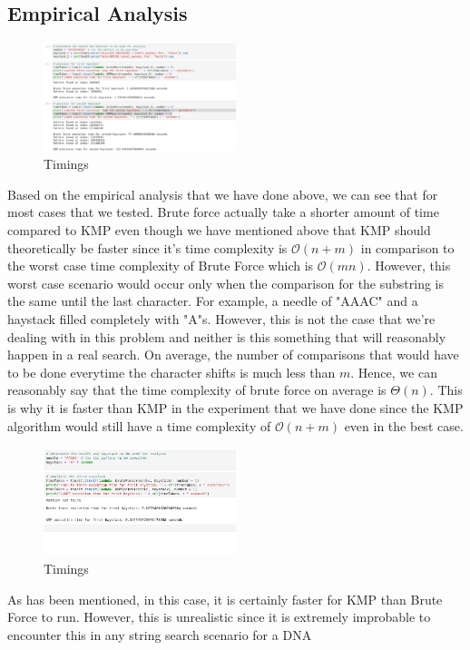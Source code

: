 \subsection*{Empirical Analysis}

\begin{figure}[h!]
    \centering
    \includegraphics[width=0.50\textwidth]{images/jupyter.png}
    \caption{Timings}
\end{figure}

Based on the empirical analysis that we have done above, we can see that for most cases that we tested. Brute force actually take a shorter amount of time compared to KMP even though we have mentioned above that KMP should theoretically be faster since it's time complexity is $\mathcal{O}(n+m)$ in comparison to the worst case time complexity of Brute Force which is $\mathcal{O}(mn)$. However, this worst case scenario would occur only when the comparison for the substring is the same until the last character. For example, a needle of "AAAC" and a haystack filled completely with "A"s. However, this is not the case that we're dealing with in this problem and neither is this something that will reasonably happen in a real search. On average, the number of comparisons that would have to be done everytime the character shifts is much less than $m$. Hence, we can reasonably say that the time complexity of brute force on average is $\Theta(n)$. This is why it is faster than KMP in the experiment that we have done since the KMP algorithm would still have a time complexity of $\mathcal{O}(n+m)$ even in the best case.

\begin{figure}[h!]
    \centering
    \includegraphics[width=0.50\textwidth]{images/worst_case.png}
    \caption{Timings}
\end{figure}

As has been mentioned, in this case, it is certainly faster for KMP than Brute Force to run. However, this is unrealistic since it is extremely improbable to encounter this in any string search scenario for a DNA